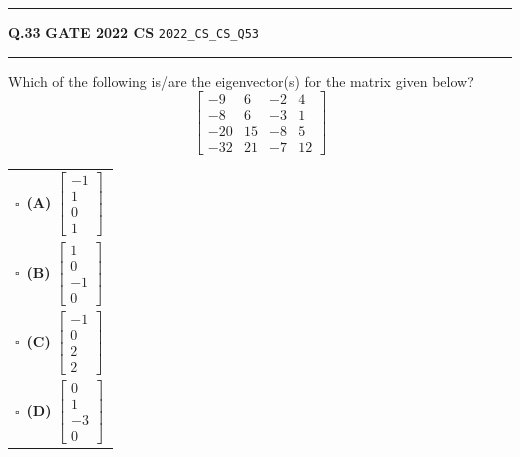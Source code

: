 \documentclass[a4paper,10pt]{article}
\begin{document}
\vspace{6pt}\hrule height 0.35pt\vspace{6pt}
\noindent
\begin{tcolorbox}[
    blanker,
    sidebyside,
    sidebyside align=top,
    lefthand width=0.55\textwidth,
    top=4pt, bottom=4pt, left=0pt, right=0pt,
    middle=16pt,
    underlay={
        \draw[dashed, black!80, line width=0.8pt, dash pattern=on 4pt off 3pt]
            ([xshift=0.55\textwidth+8pt]frame.north west) --
            ([xshift=0.55\textwidth+8pt]frame.south west);
    }
]
\textbf{Q.33}  \hfill {\footnotesize\textbf{GATE 2022 CS} \quad \tiny\texttt{2022\_CS\_CS\_Q53}}
\vspace{2pt}\hrule height 0.3pt\vspace{4pt}

Which of the following is/are the eigenvector(s) for the matrix given below?
\[ \begin{bmatrix} -9 & 6 & -2 & 4 \\ -8 & 6 & -3 & 1 \\ -20 & 15 & -8 & 5 \\ -32 & 21 & -7 & 12 \end{bmatrix} \]

\par\vspace{6pt}\noindent
\begin{tabular}{@{}p{0.98\linewidth}@{}}
$\square$\ \textbf{(A)} $\begin{bmatrix} -1 \\ 1 \\ 0 \\ 1 \end{bmatrix}$ \\
\addlinespace[3pt]
$\square$\ \textbf{(B)} $\begin{bmatrix} 1 \\ 0 \\ -1 \\ 0 \end{bmatrix}$ \\
\addlinespace[3pt]
$\square$\ \textbf{(C)} $\begin{bmatrix} -1 \\ 0 \\ 2 \\ 2 \end{bmatrix}$ \\
\addlinespace[3pt]
$\square$\ \textbf{(D)} $\begin{bmatrix} 0 \\ 1 \\ -3 \\ 0 \end{bmatrix}$
\end{tabular}


\end{tcolorbox}
\end{document}
